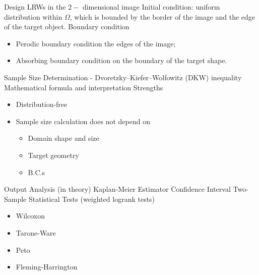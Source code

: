 \documentclass{article}
\begin{document}
\begin{outline}[enumerate]
     \3 Design LRWs in the $2-$ dimensional image
         \4 Initial condition: uniform distribution within $\Omega$, which is bounded by the border of the image and the edge of the target object.
         \4 Boundary condition
           \begin{itemize}
             \item Perodic boundary condition the edges of the image;
             \item Absorbing boundary condition on the boundary of the target shape.
           \end{itemize}
      
             
      \3 Sample Size Determination - Dvoretzky–Kiefer–Wolfowitz (DKW) inequality \cite{dvoretzky1956asymptotic}
        \4 Mathematical formula and interpretation
        \4 Strengths
          \begin{itemize}
            \item Distribution-free
            \item Sample size calculation does not depend on 
              \begin{itemize}
                \item Domain shape and size
                \item Target geometry
                \item B.C.s
              \end{itemize}
          \end{itemize}
          
     \3 Output Analysis (in theory)
        \4 Kaplan-Meier Estimator \cite{kaplan1958nonparametric} \cite{aalen2008survival}
        \4 Confidence Interval \cite{greenwoodnatural} \cite{hosmer2011applied} \cite{kalbfleisch2011statistical}\cite{sawyer2003greenwood}
        \4 Two-Sample Statistical Tests (weighted logrank tests) \cite{custodio2007diagnostics} \cite{agarwal2012statistics} \cite{karadeniz2017examining} \cite{leton2001equivalence} \cite{etikan2017kaplan} \cite{harrington1982class}
          \begin{itemize}
            \item Wilcoxon
            \item Tarone-Ware
            \item Peto
            \item Fleming-Harrington
          \end{itemize}
          



\end{outline}
\end{document}
